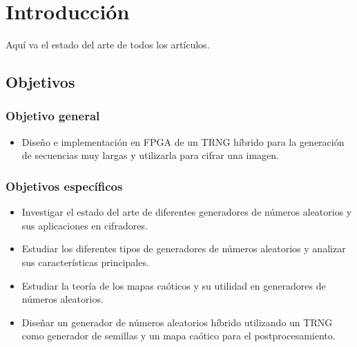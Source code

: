 \chapter{Introducción}
    Aquí va el estado del arte de todos los artículos.
	
	\section{Objetivos}
	
		\subsection{Objetivo general}
			\begin{itemize}
				\item Diseño e implementación en FPGA de un TRNG híbrido para la generación de secuencias muy largas y utilizarla para cifrar una imagen.
			\end{itemize}
		
		\subsection{Objetivos específicos}
			\begin{itemize}
                \item Investigar el estado del arte de diferentes generadores de números aleatorios y sus aplicaciones en cifradores.
                \item Estudiar los diferentes tipos de generadores de números aleatorios y analizar sus características principales.
                \item Estudiar la teoría de los mapas caóticos y su utilidad en generadores de números aleatorios.
                \item Diseñar un generador de números aleatorios híbrido utilizando un TRNG como generador de semillas y un mapa caótico para el postprocesamiento.
			\end{itemize}
